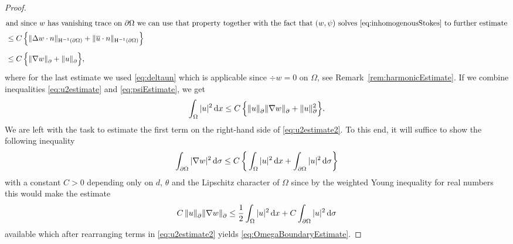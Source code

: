 \begin{proof}
\begin{align}
    \intertext{and since $w$ has vanishing trace on $\partial\Omega$ we can use that property together with the fact that  $(w,\psi)$ solves \eqref{eq:inhomogenousStokes} to further estimate}
    &\leq C \, \Big\{ \| \Delta w \cdot n \|_{\mathrm{H}^{-1}(\partial\Omega)} + \| \overline u \cdot n \|_{\mathrm{H}^{-1}(\partial\Omega)} \Big\} \nonumber\\[0.5em]
    &\leq C \, \Big\{ \|  \nabla w\|^{}_\partial + \|u\|^{}_\partial  \Big\}, \label{eq:psiEstimate}
  \end{align}
  where for the last estimate we used \eqref{eq:deltaun} which is applicable since $\div w = 0$ on $\Omega$, see Remark~\ref{rem:harmonicEstimate}.
  If we combine inequalities \eqref{eq:u2estimate} and \eqref{eq:psiEstimate}, we get
  \begin{align}
    \int_\Omega |u|^2 \, {\operatorname{d}\!{x}} \leq C \, \Big\{ \|u\|^{}_\partial \|\nabla w \|^{}_\partial + \|u\|_\partial^2\Big\}. \label{eq:u2estimate2}
  \end{align}
  We are left with the task to estimate the first term on the right-hand side of \eqref{eq:u2estimate2}.
  To this end, it will suffice to show the following inequality
  \begin{align}
    \label{eq:w2estimate}
    \int_{\partial\Omega} |\nabla w|^2 \, {\operatorname{d}\!{\sigma}} \leq C \, \bigg\{ \int_\Omega |u|^2 \, {\operatorname{d}\!{x}} + \int_{\partial\Omega} |u|^2 \, {\operatorname{d}\!{\sigma}} \bigg\}
  \end{align}
  with a constant $C > 0$ depending only on $d$, $\theta$ and the Lipschitz character of $\Omega$ since by the weighted Young inequality for real numbers this would make the estimate
  \begin{align*}
    C \, \| u\|^{}_\partial \|\nabla w\|^{}_\partial \leq \frac{1}{2} \int_\Omega |u|^2 \, {\operatorname{d}\!{x}} + C \int_{\partial\Omega} |u|^2 \, {\operatorname{d}\!{\sigma}}
  \end{align*}
  available which after rearranging terms in \eqref{eq:u2estimate2} yields \eqref{eq:OmegaBoundaryEstimate}.


\end{proof}
